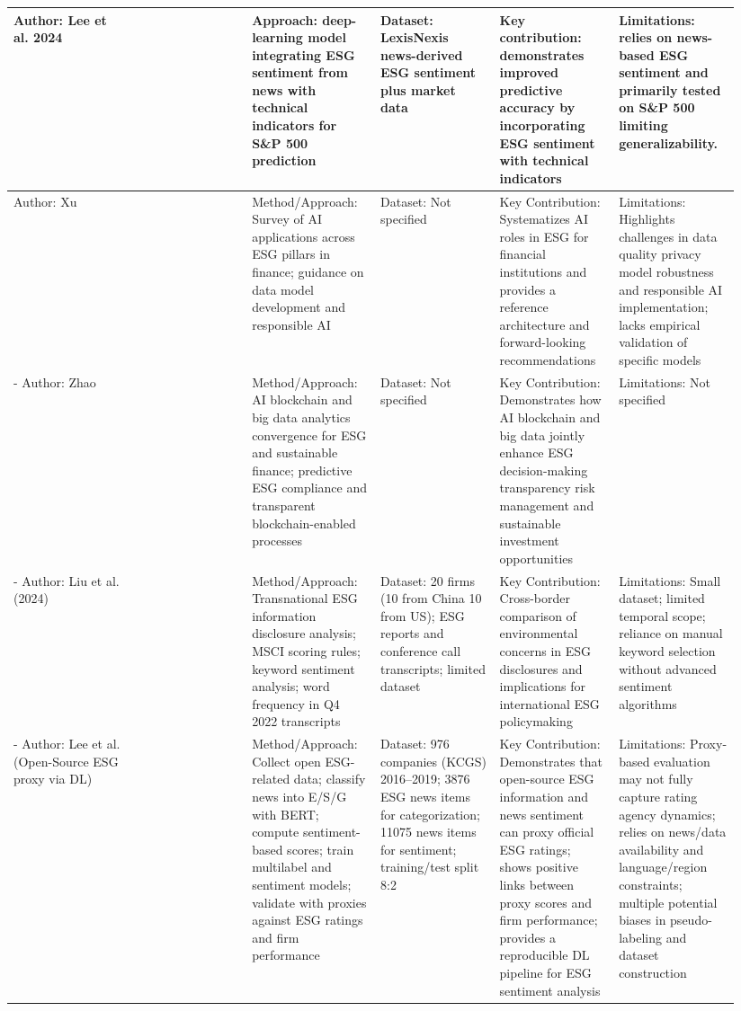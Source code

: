 \documentclass{article}
\begin{document}
\begin{landscape}
\begin{longtable}{p{0.157\linewidth} p{0.157\linewidth} p{0.157\linewidth} p{0.157\linewidth} p{0.157\linewidth} p{0.157\linewidth}}
Author: Lee et al. 2024 & ~ & Approach: deep-learning model integrating ESG sentiment from news with technical indicators for S\&P 500 prediction & Dataset: LexisNexis news-derived ESG sentiment plus market data & Key contribution: demonstrates improved predictive accuracy by incorporating ESG sentiment with technical indicators & Limitations: relies on news-based ESG sentiment and primarily tested on S\&P 500 limiting generalizability. \\ \hline
Author: Xu & ~ & Method/Approach: Survey of AI applications across ESG pillars in finance; guidance on data model development and responsible AI & Dataset: Not specified & Key Contribution: Systematizes AI roles in ESG for financial institutions and provides a reference architecture and forward-looking recommendations & Limitations: Highlights challenges in data quality privacy model robustness and responsible AI implementation; lacks empirical validation of specific models \\ \hline
- Author: Zhao & ~ & Method/Approach: AI blockchain and big data analytics convergence for ESG and sustainable finance; predictive ESG compliance and transparent blockchain-enabled processes & Dataset: Not specified & Key Contribution: Demonstrates how AI blockchain and big data jointly enhance ESG decision-making transparency risk management and sustainable investment opportunities & Limitations: Not specified \\ \hline
- Author: Liu et al. (2024) & ~ & Method/Approach: Transnational ESG information disclosure analysis; MSCI scoring rules; keyword sentiment analysis; word frequency in Q4 2022 transcripts & Dataset: 20 firms (10 from China 10 from US); ESG reports and conference call transcripts; limited dataset & Key Contribution: Cross-border comparison of environmental concerns in ESG disclosures and implications for international ESG policymaking & Limitations: Small dataset; limited temporal scope; reliance on manual keyword selection without advanced sentiment algorithms \\ \hline
- Author: Lee et al. (Open-Source ESG proxy via DL) & ~ & Method/Approach: Collect open ESG-related data; classify news into E/S/G with BERT; compute sentiment-based scores; train multilabel and sentiment models; validate with proxies against ESG ratings and firm performance & Dataset: 976 companies (KCGS) 2016–2019; 3876 ESG news items for categorization; 11075 news items for sentiment; training/test split 8:2 & Key Contribution: Demonstrates that open-source ESG information and news sentiment can proxy official ESG ratings; shows positive links between proxy scores and firm performance; provides a reproducible DL pipeline for ESG sentiment analysis & Limitations: Proxy-based evaluation may not fully capture rating agency dynamics; relies on news/data availability and language/region constraints; multiple potential biases in pseudo-labeling and dataset construction \\ \hline

\end{longtable}
\end{landscape}
\end{document}
